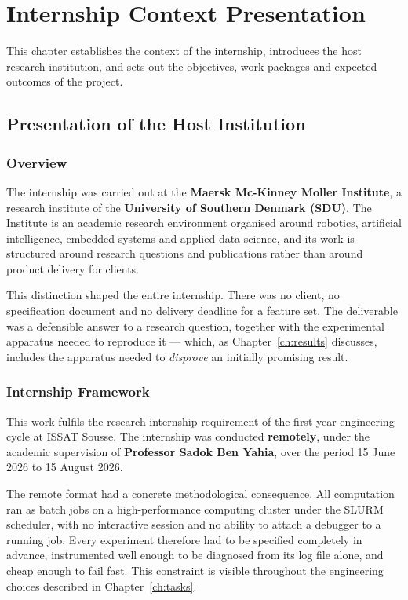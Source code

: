 \chapter{Internship Context Presentation}
\label{ch:context}

This chapter establishes the context of the internship, introduces the
host research institution, and sets out the objectives, work packages and
expected outcomes of the project.

\section{Presentation of the Host Institution}

\subsection{Overview}

The internship was carried out at the \textbf{Maersk Mc-Kinney Moller
Institute}, a research institute of the \textbf{University of Southern
Denmark (SDU)}. The Institute is an academic research environment
organised around robotics, artificial intelligence, embedded systems and
applied data science, and its work is structured around research
questions and publications rather than around product delivery for
clients.

This distinction shaped the entire internship. There was no client, no
specification document and no delivery deadline for a feature set. The
deliverable was a defensible answer to a research question, together
with the experimental apparatus needed to reproduce it --- which, as
Chapter~\ref{ch:results} discusses, includes the apparatus needed to
\emph{disprove} an initially promising result.

\subsection{Internship Framework}

This work fulfils the research internship requirement of the first-year
engineering cycle at ISSAT Sousse. The internship was conducted
\textbf{remotely}, under the academic supervision of \textbf{Professor
Sadok Ben Yahia}, over the period 15 June 2026 to 15 August 2026.

The remote format had a concrete methodological consequence. All
computation ran as batch jobs on a high-performance computing cluster
under the SLURM scheduler, with no interactive session and no ability to
attach a debugger to a running job. Every experiment therefore had to be
specified completely in advance, instrumented well enough to be
diagnosed from its log file alone, and cheap enough to fail fast. This
constraint is visible throughout the engineering choices described in
Chapter~\ref{ch:tasks}.

